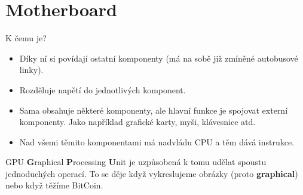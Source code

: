 \documentclass{beamer}
\begin{document}
\section{Motherboard}
\label{sec:motherboard}


\begin{frame}
	K čemu je?
	\begin{itemize}
		\item Díky ní si povídají ostatní komponenty (má na sobě již zmíněné
		      autobusové linky).
		\item Rozděluje napětí do jednotlivých komponent.
		\item Sama obsahuje některé komponenty, ale hlavní funkce je spojovat
		      externí komponenty. Jako například grafické karty, myši, klávesnice
		      atd.
		     \item Nad všemi těmito komponentami má nadvládu CPU a těm dává
		     	instrukce.
	\end{itemize}
\end{frame}

\begin{frame}{GPU}
 \textbf{G}raphical \textbf{P}rocessing \textbf{U}nit je uzpůsobená k tomu
 udělat spoustu jednoduchých operací. To se děje když vykreslujeme obrázky
 (proto \textbf{graphical}) nebo
 když těžíme BitCoin.
 
\end{frame}
\end{document}
